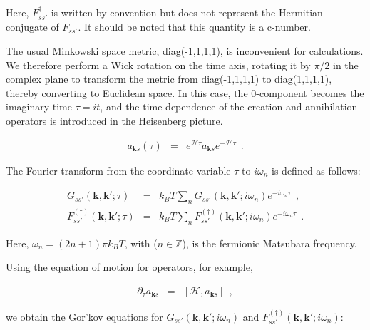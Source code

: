\documentclass[uplatex,a4j,12pt,dvipdfmx]{jsarticle}
\begin{document}
Here, $F_{ss'}^{\dagger}$ is written by convention but does not represent the Hermitian conjugate of $F_{ss'}$. It should be noted that this quantity is a c-number.

The usual Minkowski space metric, diag(-1,1,1,1), is inconvenient for calculations. We therefore perform a Wick rotation on the time axis, rotating it by $\pi/2$ in the complex plane to transform the metric from diag(-1,1,1,1) to diag(1,1,1,1), thereby converting to Euclidean space. In this case, the 0-component becomes the imaginary time $\tau=i t$, and the time dependence of the creation and annihilation operators is introduced in the Heisenberg picture.

\begin{eqnarray}
	a_{\bm{k}s}(\tau)
	&=&
	e^{ \mathcal{H} \tau } a_{\bm{k}s} e^{ - \mathcal{H} \tau }
	\ \ .
	\nonumber
\end{eqnarray}

The Fourier transform from the coordinate variable $\tau$ to $i \omega_{n}$ is defined as follows:

\begin{eqnarray}
	G_{ss'}(\bm{k} , \bm{k}' ; \tau)
	&=&
	k_{B} T \sum_{n}
	G_{ss'}(\bm{k} , \bm{k}' ; i \omega_{n} )
	e^{- i \omega_{n} \tau }
	\ \ , \nonumber \\[2mm]
	F_{ss'}^{(\dagger)}(\bm{k} , \bm{k}' ; \tau)
	&=&
	k_{B} T \sum_{n}
	F_{ss'}^{(\dagger)}(\bm{k} , \bm{k}' ; i \omega_{n} )
	e^{- i \omega_{n} \tau }
	\ \ .
\end{eqnarray}

Here, $\omega_{n}=(2n+1)\pi k_{B} T$, with ($n \in \mathbb{Z}$), is the fermionic Matsubara frequency.

Using the equation of motion for operators, for example,

\begin{eqnarray}
	\partial_{\tau} a_{\bm{k}s}
	&=&
	[\mathcal{H},a_{\bm{k}s}]
	\nonumber
	\ \ ,
\end{eqnarray}

we obtain the Gor'kov equations for $G_{ss'}(\bm{k} , \bm{k}' ; i \omega_{n} )$ and $F_{ss'}^{(\dagger)}(\bm{k} , \bm{k}' ; i \omega_{n} )$:
\end{document}
